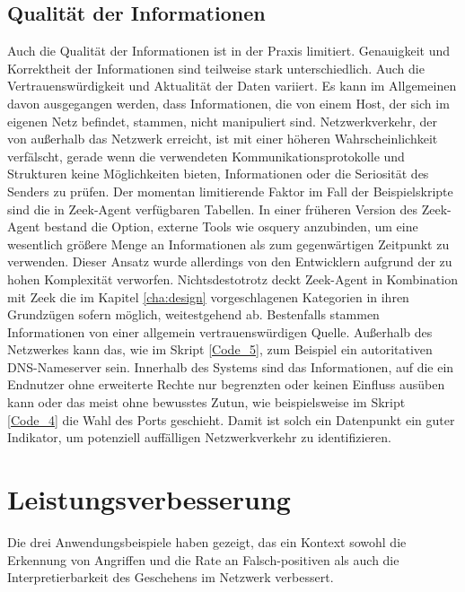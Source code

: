 \subsection{Qualität der Informationen}
Auch die Qualität der Informationen ist in der Praxis limitiert. Genauigkeit und Korrektheit der Informationen sind teilweise stark unterschiedlich. Auch die Vertrauenswürdigkeit und Aktualität der Daten variiert. Es kann im Allgemeinen davon ausgegangen werden, dass Informationen, die von einem Host, der sich im eigenen Netz befindet, stammen, nicht manipuliert sind. Netzwerkverkehr, der von außerhalb das Netzwerk erreicht, ist mit einer höheren Wahrscheinlichkeit verfälscht, gerade wenn die verwendeten Kommunikationsprotokolle und Strukturen keine Möglichkeiten bieten, Informationen oder die Seriosität des Senders zu prüfen.
Der momentan limitierende Faktor im Fall der Beispielskripte sind die in Zeek-Agent verfügbaren Tabellen. In einer früheren Version des Zeek-Agent bestand die Option, externe Tools wie osquery anzubinden, um eine wesentlich größere Menge an Informationen als zum gegenwärtigen Zeitpunkt zu verwenden. Dieser Ansatz wurde allerdings von den Entwicklern aufgrund der zu hohen Komplexität verworfen. Nichtsdestotrotz deckt Zeek-Agent in Kombination mit Zeek die im Kapitel \ref{cha:design} vorgeschlagenen Kategorien in ihren Grundzügen sofern möglich, weitestgehend ab.
Bestenfalls stammen Informationen von einer allgemein vertrauenswürdigen Quelle. Außerhalb des Netzwerkes kann das, wie im Skript \ref{Code_5}, zum Beispiel ein autoritativen DNS-Nameserver sein. Innerhalb des Systems sind das Informationen, auf die ein Endnutzer ohne erweiterte Rechte nur begrenzten oder keinen Einfluss ausüben kann oder das meist ohne bewusstes Zutun, wie beispielsweise im Skript \ref{Code_4} die Wahl des Ports geschieht. Damit ist solch ein Datenpunkt ein guter Indikator, um potenziell auffälligen Netzwerkverkehr zu identifizieren.
\section{Leistungsverbesserung}
Die drei Anwendungsbeispiele haben gezeigt, das ein Kontext sowohl die Erkennung von Angriffen und die Rate an Falsch-positiven als auch die Interpretierbarkeit des Geschehens im Netzwerk verbessert.
